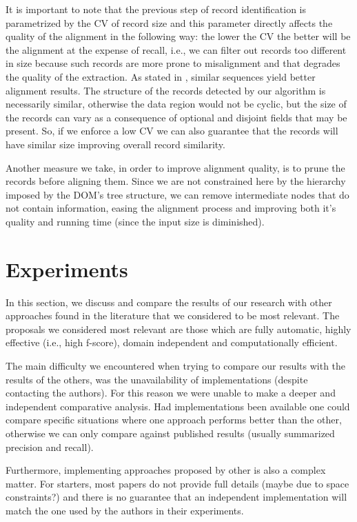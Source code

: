 \documentclass{vldb}
\begin{document}
It is important to note that the previous step of record identification
is parametrized by the CV of record size and this parameter directly affects the
quality of the alignment in the following way: the lower the CV the better will
be the alignment at the expense of recall, i.e., we can filter out records too
different in size because such records are more prone to misalignment and that
degrades the quality of the extraction. As stated in \cite{centerstar1993}, 
similar sequences yield better alignment results. The structure of the
records detected by our algorithm is necessarily similar, otherwise the
data region would not be cyclic, but the size of the records can vary as a
consequence of optional and disjoint fields that may be present.
So, if we enforce a low CV we can also guarantee that the records will have
similar size improving overall record similarity.

Another measure we take, in order to improve alignment quality, is to prune the
records before aligning them. Since we are not constrained here by the hierarchy
imposed by the DOM's tree structure, we can remove intermediate nodes that do
not contain information, easing the alignment process and improving both it's
quality and running time (since the input size is diminished).

\section{Experiments}\label{sec:result}

In this section, we discuss and compare the results of our research with other
approaches found in the literature that we considered to be most relevant. The
proposals we considered most relevant are those which are fully automatic,
highly effective (i.e., high f-score), domain independent and computationally
efficient.

The main difficulty we encountered when trying to compare our results with the
results of the others, was the unavailability of implementations (despite
contacting the authors). For this reason we were unable to make a deeper and
independent comparative analysis.
Had implementations been available one could compare specific situations where
one approach performs better than the other, otherwise we can only compare
against published results (usually summarized precision and recall).

Furthermore, implementing approaches proposed by other is also a complex matter.
For starters, most papers do not provide full details (maybe due to space
constraints?) and there is no guarantee that an independent implementation will
match the one used by the authors in their experiments.
\end{document}
